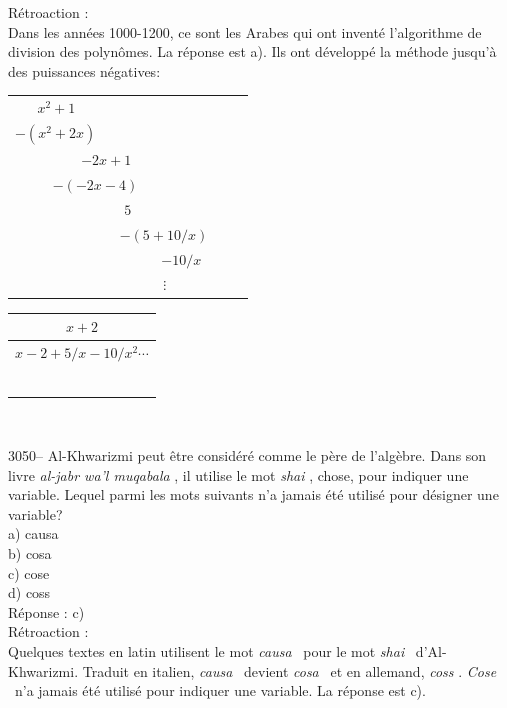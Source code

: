 \documentclass[letterpaper, 12pt]{article}
\begin{document}
R\'etroaction :\\
Dans les ann\'ees 1000-1200, ce sont les Arabes qui ont invent\'e l'algorithme de division des polyn\^omes. La r\'eponse est a). Ils ont d\'evelopp\'e la m\'ethode jusqu'\`a des puissances n\'egatives:\\
\begin{center}
\begin{tabular}{r}
$x^{2} + 1$ \ \ \ \ \ \ \ \ \ \ \ \ \ \ \ \ \ \ \ \ \ \ \ \\
\underline{$- (x^{2} + 2x)$} \ \ \ \ \ \ \ \ \ \ \ \ \ \ \ \ \ \ \ \ \\
$- 2x + 1$ \ \ \ \ \ \ \ \ \ \ \ \ \ \ \ \\
\underline{$- (-2x - 4)$} \ \ \ \ \ \ \ \ \ \ \ \ \ \ \\
$5$ \ \ \ \ \ \ \ \ \ \ \ \ \ \ \ \\
\underline{$- (5 + 10/x)$} \ \ \ \ \\
$-10/x$ \ \ \ \ \ \\
$\vdots$ \ \ \ \ \ \ \ \ \ \
\end{tabular}
\begin{tabular}{|c}
$x + 2$ \\ \hline
$x - 2 + 5/x - 10/x^{2} \cdots$\\
\\
\\
\\
\\
\\
\\

\end{tabular}\\
\end{center}



3050-- Al-Khwarizmi peut \^etre consid\'er\'e comme le p\`ere de l'alg\`ebre. Dans son livre \og \emph{al-jabr wa'l muqabala} \fg, il utilise le mot \og \emph{shai} \fg, chose, pour indiquer une variable. Lequel parmi les mots suivants n'a jamais \'et\'e utilis\'e pour d\'esigner une variable?\\

a) causa\\
b) cosa\\
c) cose\\
d) coss\\

R\'eponse : c)\\

R\'etroaction :\\
Quelques textes en latin utilisent le mot \og \emph{causa} \fg \ pour le mot \og \emph{shai} \fg \ d'Al-Khwarizmi. Traduit en italien, \og \emph{causa} \fg \ devient \og \emph{cosa} \fg \ et en allemand, \og \emph{coss} \fg. \og \emph{Cose} \fg \ n'a jamais \'et\'e utilis\'e pour indiquer une variable. La r\'eponse est c).\\
\end{document}
